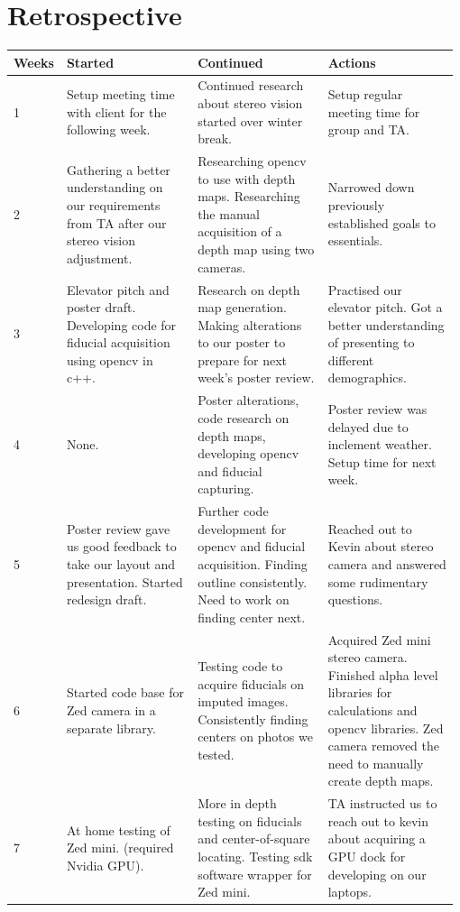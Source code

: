 \documentclass[onecolumn, draftclsnofoot,10pt, compsoc]{IEEEtran}
\begin{document}
\section{Retrospective}
\begin{longtable}{ | p{0.075\linewidth} | p{0.3\linewidth} | p{0.3\linewidth} | p{0.3\linewidth} |} \hline
Weeks & Started & Continued & Actions  \\ \hline
1 & Setup meeting time with client for the following week. & Continued research about stereo vision started over winter break. & Setup regular meeting time for group and TA. \\ \hline
2 & Gathering a better understanding on our requirements from TA after our stereo vision adjustment. & Researching opencv to use with depth maps. Researching the manual acquisition of a depth map using two cameras. & Narrowed down previously established goals to essentials. \\ \hline
3 & Elevator pitch and poster draft. 
Developing code for fiducial acquisition using opencv in c++.
 & Research on depth map generation. Making alterations to our poster to prepare for next week’s poster review. & Practised our elevator pitch. 
Got a better understanding of presenting to different demographics. \\ \hline
4 & None. & Poster alterations, code research on depth maps, developing opencv and fiducial capturing. & Poster review was delayed due to inclement weather. Setup time for next week. \\ \hline
5 & Poster review gave us good feedback to take our layout and presentation. Started redesign draft. & Further code development for opencv and fiducial acquisition. Finding outline consistently. Need to work on finding center next. & Reached out to Kevin about stereo camera and answered some rudimentary questions. \\ \hline
6 & Started code base for Zed camera in a separate library. & Testing code to acquire fiducials on imputed images. Consistently finding centers on photos we tested.  & Acquired Zed mini stereo camera. Finished alpha level libraries for calculations and opencv libraries. Zed camera removed the need to manually create depth maps. \\ \hline
7 & At home testing of Zed mini. (required Nvidia GPU). & More in depth testing on fiducials and center-of-square locating. 
Testing sdk software wrapper for Zed mini. & TA instructed us to reach out to kevin about acquiring a GPU dock for developing on our laptops. \\ \hline
\end{longtable}
\end{document}
